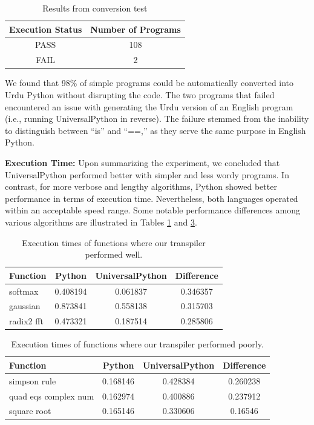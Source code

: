 \documentclass[conference]{IEEEtran}
\begin{document}
    

\begin{table}[h]
\centering
\caption{Results from conversion test}
\vspace{3mm}
\label{tab:execution_results}
\begin{tabular}{cc}
\hline
 Execution Status & Number of Programs \\
\hline
 PASS & 108 \\
 FAIL & 2 \\
\hline
\end{tabular}
\end{table}



We found that 98\% of simple programs could be automatically converted into Urdu Python without disrupting the code. The two programs that failed encountered an issue with generating the Urdu version of an English program (i.e., running UniversalPython in reverse). The failure stemmed from the inability to distinguish between “is” and “==,” as they serve the same purpose in English Python.

\textbf{Execution Time:} Upon summarizing the experiment, we concluded that UniversalPython performed better with simpler and less wordy programs. In contrast, for more verbose and lengthy algorithms, Python showed better performance in terms of execution time. Nevertheless, both languages operated within an acceptable speed range. Some notable performance differences among various algorithms are illustrated in Tables \ref{tab:execution_results} and \ref{tab:execution_times_poor}.

\begin{table}[h]
\centering
\caption{Execution times of functions where our transpiler performed well.}
\vspace{3mm}
\label{tab:execution_times} 
\begin{tabular}{lccc}
\hline
 Function & Python & UniversalPython & Difference \\
\hline
 softmax & 0.408194 & 0.061837 & 0.346357 \\
 gaussian & 0.873841 & 0.558138 & 0.315703 \\
 radix2 fft & 0.473321 & 0.187514 & 0.285806 \\ 
\hline
\end{tabular}
\end{table}

  \begin{table}[h]
\centering
\caption{Execution times of functions where our transpiler performed poorly.}
\vspace{3mm}
\label{tab:execution_times_poor} 
\begin{tabular}{lccc}
\hline
 Function & Python & UniversalPython & Difference \\
\hline
 simpson rule & 0.168146 & 0.428384 & 0.260238 \\
 quad eqs complex num & 0.162974 & 0.400886 & 0.237912 \\
 square root & 0.165146 & 0.330606 & 0.16546 \\ 
\hline
\end{tabular}
\end{table}
\end{document}

